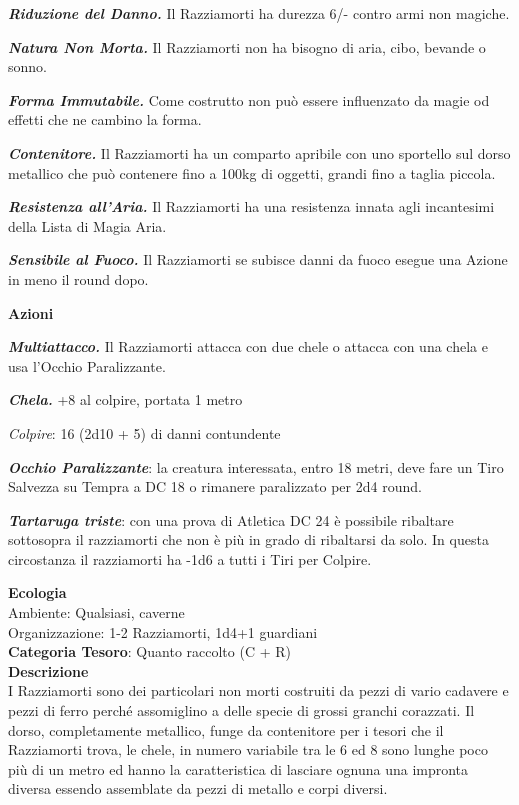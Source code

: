 \begin{multicols}{2}
{\emph{\textbf{Riduzione del Danno.}} Il Razziamorti ha durezza 6/- contro armi non magiche.

\emph{\textbf{Natura Non Morta.}} Il Razziamorti non ha bisogno di aria, cibo, bevande o sonno.

\emph{\textbf{Forma Immutabile.}} Come costrutto non può essere influenzato da magie od effetti che ne cambino la forma.

\emph{\textbf{Contenitore.}} Il Razziamorti ha un comparto apribile con uno sportello sul dorso metallico che può contenere fino a 100kg di oggetti, grandi fino a taglia piccola.

\emph{\textbf{Resistenza all'Aria.}} Il Razziamorti ha una resistenza innata agli incantesimi della Lista di Magia Aria.

\emph{\textbf{Sensibile al Fuoco.}} Il Razziamorti se subisce danni da fuoco esegue una Azione in meno il round dopo.

\textbf{Azioni}

\emph{\textbf{Multiattacco.}} Il Razziamorti attacca con due chele o attacca con una chela e usa l'Occhio Paralizzante.

\textbf{\emph{Chela.}} +8 al colpire, portata 1 metro

\emph{Colpire}: 16 (2d10 + 5) di danni contundente

\emph{\textbf{Occhio Paralizzante}}: la creatura interessata, entro 18 metri, deve fare un Tiro Salvezza su Tempra a DC 18 o rimanere paralizzato per 2d4 round.

\emph{\textbf{Tartaruga triste}}: con una prova di Atletica DC 24 è possibile ribaltare sottosopra il razziamorti che non è più in grado di ribaltarsi da solo. In questa circostanza il razziamorti ha -1d6 a tutti i Tiri per Colpire.

\textbf{Ecologia}\\
Ambiente: Qualsiasi, caverne\\
Organizzazione: 1-2 Razziamorti, 1d4+1 guardiani\\
\textbf{Categoria Tesoro}: Quanto raccolto (C + R)\\
\textbf{Descrizione}\\
I Razziamorti sono dei particolari non morti costruiti da pezzi di vario cadavere e pezzi di ferro perché assomiglino a delle specie di grossi granchi corazzati.
Il dorso, completamente metallico, funge da contenitore per i tesori che il Razziamorti trova, le chele, in numero variabile tra le 6 ed 8 sono lunghe poco più di un metro ed hanno la caratteristica di lasciare ognuna una impronta diversa essendo assemblate da pezzi di metallo e corpi diversi.

}
\end{multicols}

